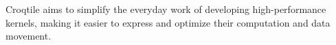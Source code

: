 Croqtile aims to simplify the everyday work of developing high-performance kernels, making it easier to express and optimize their computation and data movement.
